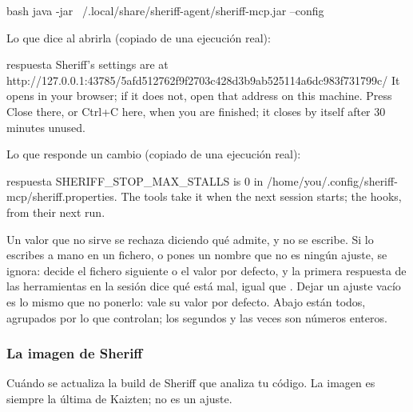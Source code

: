 \documentclass[11pt,a4paper]{article}
\begin{document}
\begin{command}{bash}
java -jar ~/.local/share/sheriff-agent/sheriff-mcp.jar --config
\end{command}

Lo que dice  al abrirla (copiado de una ejecución real):

\begin{command}[basicstyle=\ttfamily\footnotesize]{respuesta}
Sheriff's settings are at http://127.0.0.1:43785/5afd512762f9f2703c428d3b9ab525114a6dc983f731799c/
It opens in your browser; if it does not, open that address on this machine. Press Close
there, or Ctrl+C here, when you are finished; it closes by itself after 30 minutes unused.
\end{command}

Lo que responde un cambio (copiado de una ejecución real):

\begin{command}[basicstyle=\ttfamily\footnotesize]{respuesta}
SHERIFF_STOP_MAX_STALLS is 0 in /home/you/.config/sheriff-mcp/sheriff.properties.
The tools take it when the next session starts; the hooks, from their next run.
\end{command}

Un valor que no sirve se rechaza diciendo qué admite, y no se escribe. Si lo
escribes a mano en un fichero, o pones un nombre que no es ningún ajuste, se
ignora: decide el fichero siguiente o el valor por defecto, y la primera
respuesta de las herramientas en la sesión dice qué está mal, igual que
. Dejar un ajuste vacío es lo mismo que no ponerlo: vale su valor por defecto. Abajo
están todos, agrupados por lo que controlan; los segundos y las veces son
números enteros.

\subsubsection*{La imagen de Sheriff} Cuándo se actualiza la build de Sheriff
que analiza tu código. La imagen es siempre la última de Kaizten; no es un
ajuste.

\end{document}
